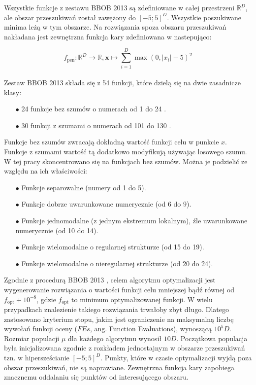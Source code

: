 \documentclass[a4paper,onecolumn,oneside,12pt,wide,floatssmall]{mwrep}
\theoremstyle{definition}
\theoremstyle{plain}%
\theoremstyle{remark}
\begin{document}
Wszystkie funkcje z zestawu BBOB 2013 są zdefiniowane w całej przestrzeni $\mathbb{R}^D$, ale obszar
przeszukiwań został zawężony do $[-5; 5]^D$. Wszystkie poszukiwane minima leżą w tym obszarze.
Na rozwiązania spoza obszaru przeszukiwań nakładana jest zewnętrzna funkcja kary zdefiniowana w \cite{setup} nastepująco: 

$$ f_\text{pen} : \mathbb{R}^D \rightarrow \mathbb{R}, 
\textbf{x} \mapsto \sum\limits_{i=1}^D \max\left(0, |x_i| - 5\right)^2 $$ 
\\
Zestaw BBOB 2013 składa się z 54 funkcji, które dzielą się na dwie zasadnicze klasy:

\begin{itemize}
 \item[$\bullet$] 24 funkcje bez szumów o numerach od 1 do 24 \cite{noiseless}. 
 \item[$\bullet$] 30 funkcji z szumami o numerach od 101 do 130 \cite{noisy}.
\end{itemize} 

Funkcje bez szumów zwracają dokładną wartość funkcji celu w punkcie $x$. Funkcje z szumami wartość tą dodatkowo modyfikują używając 
losowego szumu. W tej pracy skoncentrowano się na funkcjach bez szumów. Można je podzielić ze względu
na ich właściwości:

\begin{itemize}
 \item[$\bullet$] Funkcje separowalne (numery od 1 do 5).
 \item[$\bullet$] Funkcje dobrze uwarunkowane numerycznie (od 6 do 9).
 \item[$\bullet$] Funkcje jednomodalne (z jednym ekstremum lokalnym), źle uwarunkowane numerycznie (od 10 do 14).
 \item[$\bullet$] Funkcje wielomodalne o regularnej strukturze (od 15 do 19).
 \item[$\bullet$] Funkcje wielomodalne o nieregularnej strukturze (od 20 do 24).
\end{itemize} 

Zgodnie z procedurą BBOB 2013 \cite{setup}, 
celem algorytmu optymalizacji jest wygenerowanie rozwiązania o wartości funkcji celu mniejszej bądź 
równej od $f_\text{opt} + 10^{-8}$, gdzie $f_\text{opt}$ to minimum optymalizowanej funkcji. 
W wielu przypadkach znalezienie takiego rozwiązania trwałoby zbyt długo.
Dlatego zastosowano kryterium stopu,
jakim jest ograniczenie na maksymalną liczbę wywołań funkcji oceny ($FEs$, ang. Function Evaluations), wynoszącą $10^5D$. 
Rozmiar populacji $\mu$ dla każdego algorytmu wynosił $10D$. 
Początkowa populacja była inicjalizowana zgodnie z rozkładem jednostajnym w obszarze przeszukiwań tzn.
w hipersześcianie $[-5; 5]^D$. Punkty, które w czasie optymalizacji wyjdą poza obszar
przeszukiwań, nie są naprawiane. Zewnętrzna funkcja kary
zapobiega znacznemu oddalaniu się punktów od interesującego obszaru.
\end{document}
